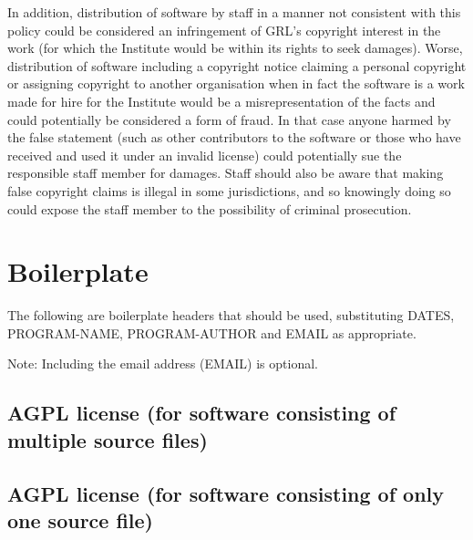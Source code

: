 \documentclass[10pt,a4paper]{article}
\begin{document}
\par In addition, distribution of software by staff in a manner not consistent with 
this policy could be considered an infringement of GRL's copyright interest in the 
work (for which the Institute would be within its rights to seek damages). Worse, 
distribution of software including a copyright notice claiming a personal copyright 
or assigning copyright to another organisation when in fact the software is a work 
made for hire for the Institute would be a misrepresentation of the facts and could 
potentially be considered a form of fraud. In that case anyone harmed by the false  
statement (such as other contributors to the software or those who have received 
and used it under an invalid license) could potentially sue the responsible staff 
member for damages. Staff should also be aware that making false copyright 
claims is illegal in some jurisdictions, and so knowingly doing so could expose 
the staff member to the possibility of criminal prosecution. 




\appendix

\section{Boilerplate}
\label{appendix:boilerplate}

The following are boilerplate headers that should be used, substituting 
DATES, PROGRAM-NAME, PROGRAM-AUTHOR and EMAIL as appropriate.

Note: Including the email address (EMAIL) is optional. 

\subsection{AGPL license (for software consisting of multiple source files)}
\begin{boilerplate}

\end{boilerplate}

\subsection{AGPL license (for software consisting of only one source file)}
\begin{boilerplate}

\end{boilerplate}
\end{document}
